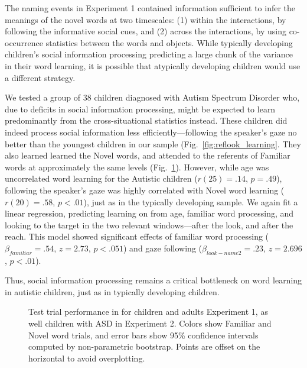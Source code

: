 \documentclass{pnastwo}
\begin{document}
\begin{article}
The naming events in Experiment 1 contained information sufficient to infer the meanings of the novel words at two timescales: (1) within the interactions, by following the informative social cues, and (2) across the interactions, by using co-occurrence statistics between the words and objects. While typically developing children's social information processing predicting a large chunk of the variance in their word learning, it is possible that atypically developing children would use a different strategy.

We tested a group of 38 children diagnosed with Autism Spectrum Disorder who, due to deficits in social information processing, might be expected to learn predominantly from the cross-situational statistics instead. These children did indeed process social information less efficiently---following the speaker's gaze no better than the youngest children in our sample (Fig.~\ref{fig:reflook_learning}. They also learned learned the Novel words, and attended to the referents of Familiar words at approximately the same levels (Fig.~\ref{fig:reflook_test}). However, while age was uncorrelated  word learning for the Autistic children ($r(25) = .14$, $p =.49$), following the speaker's gaze was highly correlated with Novel word learning ($r(20) = .58$, $p <.01$), just as in the typically developing sample. We again fit a linear regression, predicting learning on from age, familiar word processing, and looking to the target in the two relevant windows---after the look, and after the reach. This model showed significant effects of familiar word processing ($\beta_{familiar} = .54$, $z = 2.73$, $p < . 051$) and gaze following  ($\beta_{look-name2} = .23$, $z = 2.696$, $p < .01$).

Thus, social information processing remains a critical bottleneck on word learning in autistic children, just as in typically developing children.


\begin{figure}[tb]
	\caption{\label{fig:reflook_test} Test trial performance in for children and adults Experiment 1, as well children with ASD in Experiment 2. Colors show Familiar and Novel word trials, and error bars show 95\% confidence intervals computed by non-parametric bootstrap. Points are offset on the horizontal to avoid overplotting.}
\end{figure}


\end{article}
\end{document}
